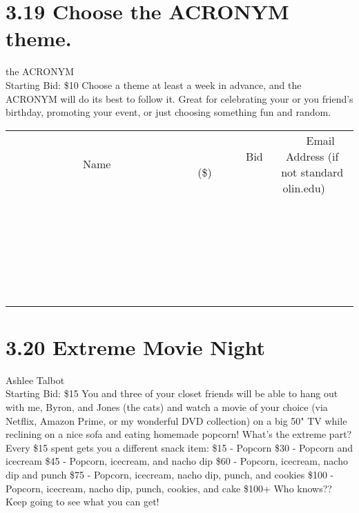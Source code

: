 \documentclass[11pt]{article}
\begin{document}
\section*{3.19 Choose the ACRONYM theme.}
the ACRONYM
\\
Starting Bid: \$10
\newline
Choose a theme at least a week in advance, and the ACRONYM will do its best to follow it. Great for celebrating your or you friend's birthday, promoting your event, or just choosing something fun and random.
\\[6ex]
\begin{tabular}{c c c}
~~~~~~~~~~~~~Name~~~~~~~~~~~~~ & ~~~~~~~~~Bid (\$)~~~~~~~~~  & ~~~Email Address (if not standard olin.edu)~~~\\
 & & \\
\hline
 & & \\
\hline
 & & \\
\hline
 & & \\
\hline
 & & \\
\hline
 & & \\
\hline
 & & \\
\hline
 & & \\
\hline
 & & \\
\hline
 & & \\
\hline
 & & \\
\hline
 & & \\
\hline
 & & \\
\hline
 & & \\
\hline
 & & \\
\hline
 & & \\
\hline
 & & \\
\hline
 & & \\
\hline
 & & \\
\hline
 & & \\
\hline
 & & \\
\hline
 & & \\
\hline
 & & \\
\hline
 & & \\
\hline
 & & \\
\hline
 & & \\
\hline
\end{tabular}
\newpage
\section*{3.20 Extreme Movie Night}
Ashlee Talbot
\\
Starting Bid: \$15
\newline
You and three of your closet friends will be able to hang out with me, Byron, and Jones (the cats) and watch a movie of your choice (via Netflix, Amazon Prime, or my wonderful DVD collection) on a big 50" TV while reclining on a nice sofa and eating homemade popcorn! What's the extreme part?  Every \$15 spent gets you a different snack item:
\$15 - Popcorn
\$30 - Popcorn and icecream
\$45 - Popcorn, icecream, and nacho dip
\$60 - Popcorn, icecream, nacho dip and punch
\$75 - Popcorn, icecream, nacho dip, punch, and cookies
\$100 - Popcorn, icecream, nacho dip, punch, cookies, and cake
\$100+ Who knows?? Keep going to see what you can get!
\end{document}

